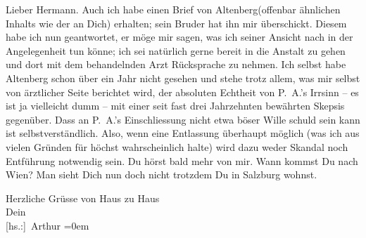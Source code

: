 \pstart{}Lieber Hermann.\pend\vspace{0.5em}
\pstart
           Auch ich habe einen Brief von Altenberg\introOben{}(\introOben{}offenbar ähnlichen Inhalts wie der an Dich\introOben{})\introOben{} erhalten; sein Bruder hat ihn mir überschickt. Diesem habe ich nun
               geantwortet, er möge mir sagen, was ich seiner Ansicht nach in der Angelegenheit tun
               könne; ich sei natürlich gerne bereit in die Anstalt zu gehen und dort mit dem
               behandelnden Arzt
               Rücksprache zu nehmen. Ich selbst habe Altenberg schon über ein Jahr nicht gesehen und stehe trotz allem, was mir
               selbst von ärztlicher Seite berichtet wird, der absoluten Echtheit von P. A.’s Irr{\pb}sinn – es ist ja
               vielleicht dumm – mit einer seit fast drei Jahrzehnten bewährten Skepsis gegenüber.
               Dass an P. A.’s Einschliessung nicht etwa böser
               Wille schuld sein kann ist selbstverständlich. Also, wenn eine Entlassung überhaupt
               möglich (was ich aus vielen Gründen für höchst wahrscheinlich halte) wird dazu weder
               Skandal noch Entführung notwendig sein. Du hörst bald mehr von mir. Wann kommst Du
               nach Wien? Man sieht Dich nun doch nicht trotzdem
               Du in Salzburg wohnst.\pend
           
\pstart
           Herzliche Grüsse von Haus zu Haus{\\[\baselineskip]}Dein{\\[\baselineskip]}\spacefill\mbox{{[}hs.:{]} Arthur}\pend
           \leftskip=0em{}\endnumbering{}  \newcommand{\dateiname}{L02122}\newcommand{\titel}{Arthur Schnitzler an Hermann Bahr, 18. 4. 1913}\newcommand{\editorInnen}{Herausgegeben von Martin Anton Müller}
